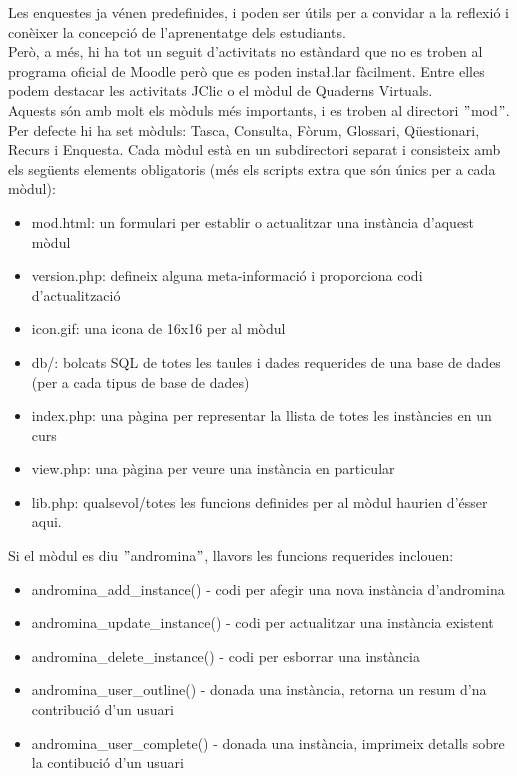 \documentclass[a4paper]{report}  %
\begin{document}
Les enquestes ja vénen predefinides, i poden ser útils per a convidar a la reflexió i conèixer la concepció de l'aprenentatge dels estudiants.\\ 
Però, a més, hi ha tot un seguit d'activitats no estàndard que no es troben al programa oficial de Moodle però que es poden insta\l.lar fàcilment. Entre elles podem destacar les activitats JClic o el mòdul de Quaderns Virtuals.\\ 
Aquests són amb molt els mòduls més importants, i es troben al directori $"$mod$"$. Per defecte hi ha set mòduls: Tasca, Consulta, Fòrum, Glossari, Qüestionari, Recurs i Enquesta. Cada mòdul està en un subdirectori separat i consisteix amb els següents elements obligatoris (més els scripts extra que són únics per a cada mòdul): \\
\begin{itemize}
\item mod.html: un formulari per establir o actualitzar una instància d'aquest mòdul 
\item version.php: defineix alguna meta-informació i proporciona codi d'actualització 
\item icon.gif: una icona de 16x16 per al mòdul 
\item db/: bolcats SQL de totes les taules i dades requerides de una base de dades (per a cada tipus de base de dades) 
\item index.php: una pàgina per representar la llista de totes les instàncies en un curs 
\item view.php: una pàgina per veure una instància en particular 
\item lib.php: qualsevol/totes les funcions definides per al mòdul haurien d'ésser aqui. 
\end{itemize}
Si el mòdul es diu $"$andromina$"$, llavors les funcions requerides inclouen: 
\begin{itemize}
\item andromina\_add\_instance() - codi per afegir una nova instància d'andromina 
\item andromina\_update\_instance() - codi per actualitzar una instància existent 
\item andromina\_delete\_instance() - codi per esborrar una instància 
\item andromina\_user\_outline() - donada una instància, retorna un resum d'na contribució d'un usuari 
\item andromina\_user\_complete() - donada una instància, imprimeix detalls sobre la contibució d'un usuari 
\end{itemize}
\end{document}

